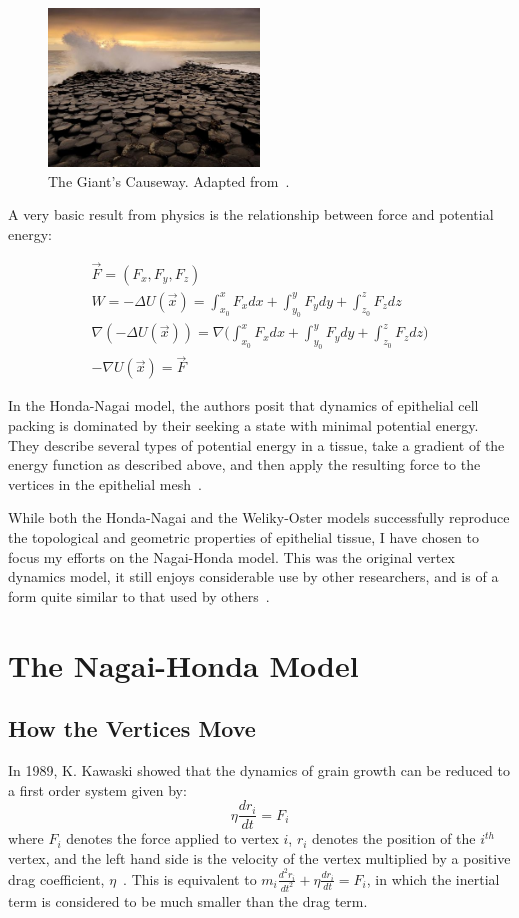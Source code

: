 \begin{figure}[ht]
\centering
\includegraphics[width=0.5\textwidth]{../diagrams/resize_giant.jpg}
\caption{The Giant's Causeway. Adapted from~\cite{Giant}.}
\label{fig:cause}
\end{figure}

A very basic result from physics is the relationship between force and potential energy:

\begin{gather}
\vec{F} = (F_x, F_y, F_z)\\
W = -\Delta U(\vec{x}) = \int_{x_0}^xF_xdx+\int_{y_0}^yF_ydy+\int_{z_0}^zF_zdz\\
\nabla(-\Delta U(\vec{x})) = \nabla\Bigg(\int_{x_0}^xF_xdx+\int_{y_0}^yF_ydy+\int_{z_0}^zF_zdz\Bigg)\\
-\nabla U(\vec{x}) = \vec{F}
\end{gather}

In the Honda-Nagai model, the authors posit that dynamics of epithelial cell packing is dominated by their seeking a state with minimal potential energy. They describe several types of potential energy in a tissue, take a gradient of the energy function as described above, and then apply the resulting force to the vertices in the epithelial mesh~\cite{HondaNagai}.

While both the Honda-Nagai and the Weliky-Oster models successfully reproduce the topological and geometric properties of epithelial tissue, I have chosen to focus my efforts on the Nagai-Honda model. This was the original vertex dynamics model, it still enjoys considerable use by other researchers, and is of a form quite similar to that used by others~\cite{Farhadifar}.

\section{The Nagai-Honda Model}
\label{sec:force}
\subsection{How the Vertices Move}
In 1989, K. Kawaski showed that the dynamics of grain growth can be reduced to a first order system given by:
\begin{equation}
\label{eq:motion}
\eta\frac{dr_i}{dt} = F_i
\end{equation}
where $F_i$ denotes the force applied to vertex $i$, $r_i$ denotes the position of the $i^{th}$ vertex,  and the left hand side is the velocity of the vertex multiplied by a positive drag coefficient, $\eta$~\cite{1989Kawasaki}. This is equivalent to $m_i\frac{d^2r_i}{dt^2} + \eta\frac{dr_i}{dt} = F_i$, in which the 
inertial term is considered to be much smaller than the drag term.

